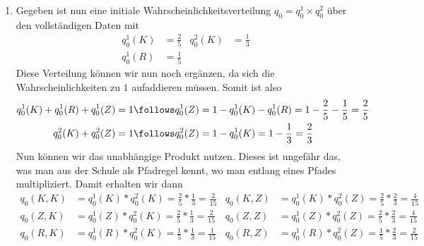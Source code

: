 \documentclass[ngerman, a4paper, 12pt]{article}
\begin{document}
\begin{enumerate}[label=\textbf{(\alph*)}, leftmargin=0pt]
	\item 
	Gegeben ist nun eine initiale Wahrscheinlichkeitsverteilung $q_0 = q_0^1 \times q_0^2$ über den vollständigen Daten mit
	\begin{align*}
		q_0^1(K) &= \frac{2}{5} & q_0^2(K) &= \frac{1}{3} \\
		q_0^1(R) &= \frac{1}{5} 
	\end{align*}
	Diese Verteilung können wir nun noch ergänzen, da sich die Wahrscheinlichkeiten zu $1$ aufaddieren müssen. Somit ist also
	\begin{equation*} 
		\begin{aligned}
			q_0^1(K) + q_0^1(R) + q_0^1(Z) = 1 &\follows q_0^1(Z) = 1 - q_0^1(K) - q_0^1(R) = 1 - \frac{2}{5} - \frac{1}{5} = \frac{2}{5} \\
			q_0^2(K) + q_0^2(Z) = 1 &\follows q_0^2(Z) = 1 - q_0^1(K) = 1 - \frac{1}{3} = \frac{2}{3}
		\end{aligned}
	\end{equation*}
	Nun können wir das unabhängige Produkt nutzen. Dieses ist ungefähr das, was man aus der Schule als Pfadregel kennt, wo man entlang eines Pfades multipliziert.
	Damit erhalten wir dann
	\begin{align*}
		q_0(K,K) &= q_0^1(K) * q_0^2(K) = \frac{2}{5} * \frac{1}{3} = \frac{2}{15} 
		& q_0(K,Z) &= q_0^1(K) * q_0^2(Z) = \frac{2}{5} * \frac{2}{3} = \frac{4}{15} \\
		q_0(Z,K) &= q_0^1(Z) * q_0^2(K) = \frac{2}{5} * \frac{1}{3} = \frac{2}{15}
		& q_0(Z,Z) &= q_0^1(Z) * q_0^2(Z) = \frac{2}{5} * \frac{2}{3} = \frac{4}{15} \\
		q_0(R,K) &= q_0^1(R) * q_0^2(K) = \frac{1}{5} * \frac{1}{3} = \frac{1}{15}
		& q_0(R,Z) &= q_0^1(R) * q_0^2(Z) = \frac{1}{5} * \frac{2}{3} = \frac{2}{15}
	\end{align*}
	

\end{enumerate}
\end{document}
